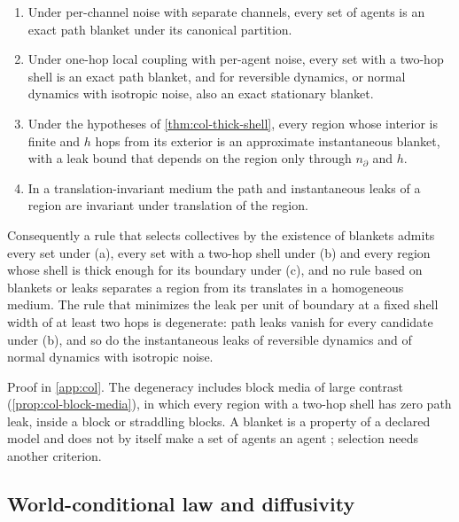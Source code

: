 \begin{proposition}\label{prop:col-selects-nothing}
\begin{enumerate}
\item[(a)] Under per-channel noise with separate channels, every set of agents is an exact path blanket under its canonical partition.
\item[(b)] Under one-hop local coupling with per-agent noise, every set with a two-hop shell is an exact path blanket, and for reversible dynamics, or normal dynamics with isotropic noise, also an exact stationary blanket.
\item[(c)] Under the hypotheses of \cref{thm:col-thick-shell}, every region whose interior is finite and $h$ hops from its exterior is an approximate instantaneous blanket, with a leak bound that depends on the region only through $n_\partial$ and $h$.
\item[(d)] In a translation-invariant medium the path and instantaneous leaks of a region are invariant under translation of the region.
\end{enumerate}
Consequently a rule that selects collectives by the existence of blankets admits every set under (a), every set with a two-hop shell under (b) and every region whose shell is thick enough for its boundary under (c), and no rule based on blankets or leaks separates a region from its translates in a homogeneous medium. The rule that minimizes the leak per unit of boundary at a fixed shell width of at least two hops is degenerate: path leaks vanish for every candidate under (b), and so do the instantaneous leaks of reversible dynamics and of normal dynamics with isotropic noise.
\end{proposition}
Proof in \cref{app:col}. The degeneracy includes block media of large contrast (\cref{prop:col-block-media}), in which every region with a two-hop shell has zero path leak, inside a block or straddling blocks. A blanket is a property of a declared model and does not by itself make a set of agents an agent \citep{bruineberg2022emperors,biehl2021technical}; selection needs another criterion.

\subsection{World-conditional law and diffusivity}\label{sup:col-world-conditional-law-and-diffusivity}

